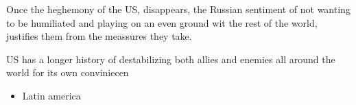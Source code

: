 Once the heghemony of the US, disappears, the Russian sentiment of not wanting to be humiliated and playing on an even ground wit the rest of the world, justifies them from the meassures they take.


US has a longer history of destabilizing both allies and enemies all around the world for its own conviniecen

\begin{itemize}
	\item Latin america
\end{itemize}

	




